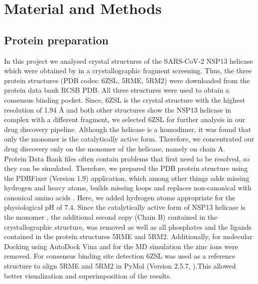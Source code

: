 \documentclass[11pt, letterpaper, titlepage]{article}
\renewcommand{\cite}{\parencite}
\begin{document}
\section{Material and Methods}
\subsection{Protein preparation}
In this project we analysed crystal structures of the SARS-CoV-2 NSP13 helicase which were obtained by \cite{Newman_2021} in a crystallographic fragment screening. Thus, the three protein structures (PDB codes: 6ZSL, 5RME, 5RM2) were downloaded from the protein data bank RCSB PDB. All three structures were used to obtain a consensus binding pocket. Since, 6ZSL is the crystal structure with the highest resolution of 1.94 {\AA} and both other structures show the NSP13 helicase in complex with a different fragment, we selected 6ZSL for further analysis in our drug discovery pipeline. Although the helicase is a homodimer, it was found that only the monomer is the catalytically active form. Therefore, we concentrated our drug discovery only on the monomer of the helicase, namely on chain A. \\
Protein Data Bank files often contain problems that first need to be resolved, so they can be simulated. Therefore, we prepared the PDB protein structure using the PDBFixer (Version 1.9) application, which among other things adds missing hydrogen and heavy atoms, builds missing loops and replaces non-canonical with canonical amino acids \cite{Eastman_2017}. Here, we added hydrogen atoms appropriate for the physiological pH of 7.4. Since the catalytically active form of NSP13 helicase is the monomer \cite{Berta_2021}, the additional second copy (Chain B) contained in the crystallographic structure, was removed as well as all phosphates and the ligands contained in the protein structures 5RME and 5RM2. Additionally, for molecular Docking using AutoDock Vina and for the \ac{MD} simulation the zinc ions were removed. 
For consensus binding site detection 6ZSL was used as a reference structure to align 5RME and 5RM2 in PyMol (Version 2.5.7, \textcite{PyMol_endnote}).This allowed better visualization and superimposition of the results.
\end{document}
